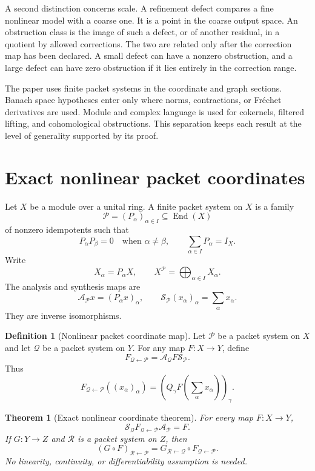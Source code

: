 \documentclass{aomart}
\newtheorem{theorem}{Theorem}[section]
\theoremstyle{definition}
\newtheorem{definition}[definition]{Definition}
\theoremstyle{remark}
\newcommand{\Acal}{\mathcal A}
\newcommand{\Pcal}{\mathcal P}
\newcommand{\Qcal}{\mathcal Q}
\newcommand{\Rcal}{\mathcal R}
\newcommand{\Scal}{\mathcal S}
\newcommand{\End}{\operatorname{End}}
\begin{document}
A second distinction concerns scale.  A refinement defect compares a fine nonlinear model with a coarse one.  It is a point in the coarse output space.  An obstruction class is the image of such a defect, or of another residual, in a quotient by allowed corrections.  The two are related only after the correction map has been declared.  A small defect can have a nonzero obstruction, and a large defect can have zero obstruction if it lies entirely in the correction range.

The paper uses finite packet systems in the coordinate and graph sections.  Banach space hypotheses enter only where norms, contractions, or Fr\'echet derivatives are used.  Module and complex language is used for cokernels, filtered lifting, and cohomological obstructions.  This separation keeps each result at the level of generality supported by its proof.

\section{Exact nonlinear packet coordinates}\label{sec:nonlinear_coordinates}

Let $X$ be a module over a unital ring.  A finite packet system on $X$ is a family
\[
\Pcal=(P_\alpha)_{\alpha\in I}\subseteq\End(X)
\]
of nonzero idempotents such that
\[
P_\alpha P_\beta=0
\quad\text{when }\alpha\ne\beta,
\qquad
\sum_{\alpha\in I}P_\alpha=I_X.
\]
Write
\[
X_\alpha=P_\alpha X,
\qquad
X^{\Pcal}=\bigoplus_{\alpha\in I}X_\alpha.
\]
The analysis and synthesis maps are
\[
\Acal_{\Pcal}x=(P_\alpha x)_\alpha,
\qquad
\Scal_{\Pcal}(x_\alpha)_\alpha=\sum_\alpha x_\alpha.
\]
They are inverse isomorphisms.

\begin{definition}[Nonlinear packet coordinate map]\label{def:nonlinear_packet_map}
Let $\Pcal$ be a packet system on $X$ and let $\Qcal$ be a packet system on $Y$.  For any map $F:X\to Y$, define
\[
F_{\Qcal\leftarrow\Pcal}
=
\Acal_{\Qcal}F\Scal_{\Pcal}.
\]
Thus
\[
F_{\Qcal\leftarrow\Pcal}((x_\alpha)_\alpha)
=
\left(
Q_\gamma F\left(\sum_\alpha x_\alpha\right)
\right)_\gamma.
\]
\end{definition}

\begin{theorem}[Exact nonlinear coordinate theorem]\label{thm:exact_nonlinear_coordinates}
For every map $F:X\to Y$,
\[
\Scal_{\Qcal}F_{\Qcal\leftarrow\Pcal}\Acal_{\Pcal}=F.
\]
If $G:Y\to Z$ and $\Rcal$ is a packet system on $Z$, then
\[
(G\circ F)_{\Rcal\leftarrow\Pcal}
=
G_{\Rcal\leftarrow\Qcal}
\circ
F_{\Qcal\leftarrow\Pcal}.
\]
No linearity, continuity, or differentiability assumption is needed.
\end{theorem}
\end{document}
